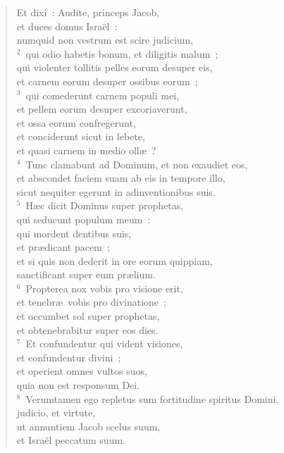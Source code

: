 \begin{flushleft}\begin{verse}\vspace{-19pt}Et dixi~: Audite, princeps Jacob,\\ et duces domus Isra\"el~:\\ numquid non vestrum est scire judicium,\\
${}^{2}$~qui odio habetis bonum, et diligitis malum~;\\ qui violenter tollitis pelles eorum desuper eis,\\ et carnem eorum desuper ossibus eorum~;\\
${}^{3}$~qui comederunt carnem populi mei,\\ et pellem eorum desuper excoriaverunt,\\ et ossa eorum confregerunt,\\ et conciderunt sicut in lebete,\\ et quasi carnem in medio oll\ae~?\\
${}^{4}$~Tunc clamabunt ad Dominum, et non exaudiet eos,\\ et abscondet faciem suam ab eis in tempore illo,\\ sicut nequiter egerunt in adinventionibus suis.\\
${}^{5}$~H\ae c dicit Dominus super prophetas,\\ qui seducunt populum meum~:\\ qui mordent dentibus suis,\\ et pr\ae dicant pacem~;\\ et si quis non dederit in ore eorum quippiam,\\ sanctificant super eum pr\ae lium.\\
${}^{6}$~Propterea nox vobis pro visione erit,\\ et tenebr\ae\ vobis pro divinatione~;\\ et occumbet sol super prophetas,\\ et obtenebrabitur super eos dies.\\
${}^{7}$~Et confundentur qui vident visiones,\\ et confundentur divini~;\\ et operient omnes vultos suos,\\ quia non est responsum Dei.\\
${}^{8}$~Verumtamen ego repletus sum fortitudine spiritus Domini,\\ judicio, et virtute,\\ ut annuntiem Jacob scelus suum,\\ et Isra\"el peccatum suum.\\

\end{verse}
\end{flushleft}
